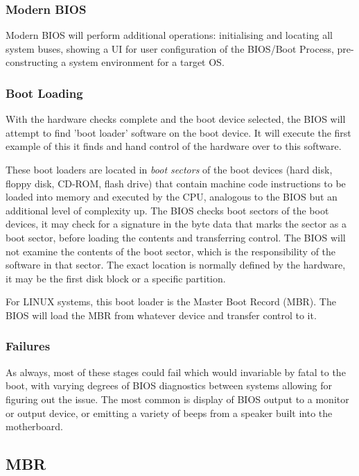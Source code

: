\documentclass[]{article}
\begin{document}
        \subsubsection{Modern BIOS}

            Modern BIOS will perform additional operations: initialising and locating all system buses, showing a UI for user configuration of the BIOS/Boot Process, pre-constructing a system environment for a target OS.

        \subsubsection{Boot Loading}

            With the hardware checks complete and the boot device selected, the BIOS will attempt to find 'boot loader' software on the boot device. It will execute the first example of this it finds and hand control of the hardware over to this software.

            These boot loaders are located in \textit{boot sectors} of the boot devices (hard disk, floppy disk, CD-ROM, flash drive) that contain machine code instructions to be loaded into memory and executed by the CPU, analogous to the BIOS but an additional level of complexity up. The BIOS checks boot sectors of the boot devices, it may check for a signature in the byte data that marks the sector as a boot sector, before loading the contents and transferring control. The BIOS will not examine the contents of the boot sector, which is the responsibility of the software in that sector. The exact location is normally defined by the hardware, it may be the first disk block or a specific partition.

            For LINUX systems, this boot loader is the Master Boot Record (MBR). The BIOS will load the MBR from whatever device and transfer control to it.

        \subsubsection{Failures}

            As always, most of these stages could fail which would invariable by fatal to the boot, with varying degrees of BIOS diagnostics between systems allowing for figuring out the issue. The most common is display of BIOS output to a monitor or output device, or emitting a variety of beeps from a speaker built into the motherboard.

    \subsection{MBR}
\end{document}
